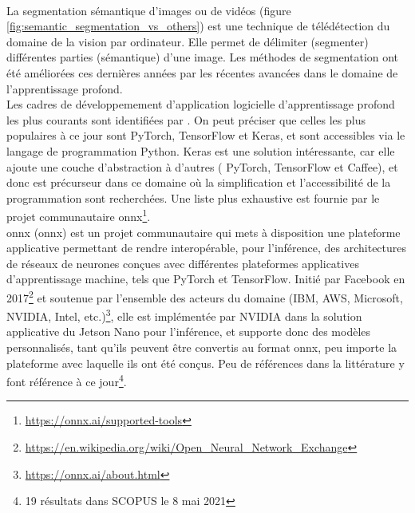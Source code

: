 \vspace{0.5\baselineskip}
\\
\noindent La segmentation sémantique d'images ou de vidéos (figure \ref{fig:semantic_segmentation_vs_others}) est une technique de télédétection du domaine de la vision par ordinateur. Elle permet de délimiter (segmenter) différentes parties (sémantique) d'une image. Les méthodes de segmentation ont été améliorées ces dernières années par les récentes avancées dans le domaine de l'apprentissage profond. 
\vspace{0.5\baselineskip}
\\
\noindent Les cadres de développemement d'application logicielle d'apprentissage profond les plus courants sont identifiées par \parencite{cornioley_integration_2018}. On peut préciser que celles les plus populaires à ce jour sont PyTorch, TensorFlow et Keras, et sont accessibles via le langage de programmation Python. Keras est une solution intéressante, car elle ajoute une couche d'abstraction à d'autres ( PyTorch, TensorFlow et Caffee), et donc est précurseur dans ce domaine où la simplification et l'accessibilité de la programmation sont recherchées. Une liste plus exhaustive est fournie par le projet communautaire \acrshort{onnx}\footnote{\url{https://onnx.ai/supported-tools}}.
\vspace{0.5\baselineskip}
\\
\noindent \acrshort{onnx} (\acrlong{onnx}) est un projet communautaire qui mets à disposition une plateforme applicative permettant de rendre interopérable, pour l'inférence, des architectures de réseaux de neurones conçues avec différentes plateformes applicatives d'apprentissage machine, tels que PyTorch et TensorFlow. Initié par Facebook en 2017\footnote{\url{https://en.wikipedia.org/wiki/Open_Neural_Network_Exchange}} et soutenue par l'ensemble des acteurs du domaine (IBM, AWS, Microsoft, NVIDIA, Intel, etc.)\footnote{\url{https://onnx.ai/about.html}}, elle est implémentée par NVIDIA dans la solution applicative du Jetson Nano pour l'inférence, et supporte donc des modèles personnalisés, tant qu'ils peuvent être convertis au format \acrshort{onnx}, peu importe la plateforme avec laquelle ils ont été conçus. Peu de références dans la littérature y font référence à ce jour\footnote{19 résultats dans SCOPUS le 8 mai 2021}.